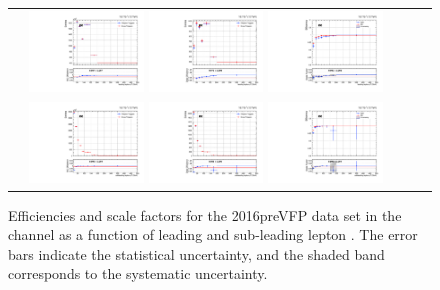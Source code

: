 \begin{figure}[htb]
  \begin{center}
    \begin{tabular}{ccc}
      \includegraphics[width=0.30\textwidth]{fig_2016preVFP_TrigSF/g_lepApt_ee_MC.pdf}
      \includegraphics[width=0.30\textwidth]{fig_2016preVFP_TrigSF/g_lepApt_ee_data.pdf}
      \includegraphics[width=0.30\textwidth]{fig_2016preVFP_TrigSF/g_ee_lepApt_FullSystUncBand.pdf}\\
      \includegraphics[width=0.30\textwidth]{fig_2016preVFP_TrigSF/g_lepBpt_ee_MC.pdf}
      \includegraphics[width=0.30\textwidth]{fig_2016preVFP_TrigSF/g_lepBpt_ee_data.pdf}
      \includegraphics[width=0.30\textwidth]{fig_2016preVFP_TrigSF/g_ee_lepBpt_FullSystUncBand.pdf}\\
    \end{tabular}
    \caption{Efficiencies and scale factors for the 2016preVFP data set in the \ee channel as a function of leading and sub-leading lepton \pT.
            The error bars indicate the statistical uncertainty, and the shaded band corresponds to the systematic uncertainty.
            }
    \label{TrigSF_2016preVFP_2}
  \end{center}
\end{figure}

